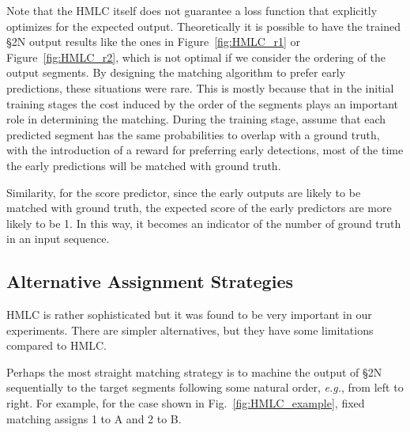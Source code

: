\documentclass[10pt,journal,compsoc]{IEEEtran}
\begin{document}
Note that the HMLC itself does not guarantee a loss function that explicitly optimizes for the expected output. Theoretically it is possible to have the trained \S2N output results like the ones in Figure~\ref{fig:HMLC_r1} or Figure~\ref{fig:HMLC_r2}, which is not optimal if we consider the ordering of the output segments. By designing the matching algorithm to prefer early predictions, these situations were rare. This is mostly because that in the initial training stages the cost induced by the order of the segments plays an important role in determining the matching. During the training stage, assume that each predicted segment has the same probabilities to overlap with a ground truth, with the introduction of a reward for preferring early detections, most of the time the early predictions will be matched with ground truth.


Similarity, for the score predictor, since the early outputs are likely to be matched with ground truth, the expected score of the early predictors are more likely to be 1. In this way, it becomes an indicator of the number of ground truth in an input sequence.
  


%
%
% 
%
%
%
%
%
%
%
%

\subsection{Alternative Assignment Strategies~\label{sec:alternatives_intro}}
HMLC is rather sophisticated but it was found to be very important in our experiments. There are simpler alternatives, but they have some limitations compared to HMLC. 




  Perhaps the most straight matching strategy is to machine the output of \S2N sequentially to the target segments following some natural order, \emph{e.g.}, from left to right. For example, for the case shown in Fig.~\ref{fig:HMLC_example}, fixed matching assigns 1 to A and 2 to B.
 
\end{document}
